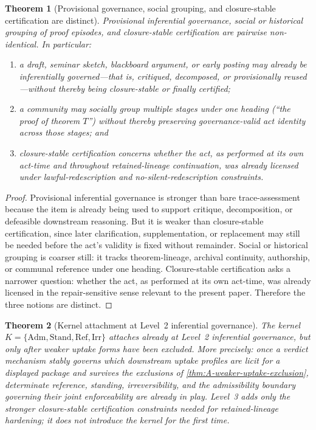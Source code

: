 \documentclass[11pt]{article}
\theoremstyle{plain}
\newtheorem{theorem}{Theorem}[section]
\theoremstyle{definition}
\newcommand{\Adm}{\mathrm{Adm}}
\newcommand{\Stand}{\mathrm{Stand}}
\begin{document}
\begin{theorem}[Provisional governance, social grouping, and closure-stable certification are distinct]
\label{thm:A-provisional-social-governance}
Provisional inferential governance, social or historical grouping of proof episodes, and closure-stable certification are pairwise non-identical. In particular:
\begin{enumerate}[label=(\roman*), leftmargin=2.5em]
    \item a draft, seminar sketch, blackboard argument, or early posting may already be inferentially governed---that is, critiqued, decomposed, or provisionally reused---without thereby being closure-stable or finally certified;
    \item a community may socially group multiple stages under one heading (``the proof of theorem $T$'') without thereby preserving governance-valid act identity across those stages; and
    \item closure-stable certification concerns whether the act, as performed at its own act-time and throughout retained-lineage continuation, was already licensed under lawful-redescription and no-silent-redescription constraints.
\end{enumerate}
\end{theorem}

\begin{proof}
Provisional inferential governance is stronger than bare trace-assessment because the item is already being used to support critique, decomposition, or defeasible downstream reasoning. But it is weaker than closure-stable certification, since later clarification, supplementation, or replacement may still be needed before the act's validity is fixed without remainder. Social or historical grouping is coarser still: it tracks theorem-lineage, archival continuity, authorship, or communal reference under one heading. Closure-stable certification asks a narrower question: whether the act, as performed at its own act-time, was already licensed in the repair-sensitive sense relevant to the present paper. Therefore the three notions are distinct.
\end{proof}

\begin{theorem}[Kernel attachment at Level~2 inferential governance]
\label{thm:A-kernel-attachment}
The kernel $K=\{\Adm,\Stand,\mathrm{Ref},\mathrm{Irr}\}$ attaches already at Level~2 inferential governance, but only after weaker uptake forms have been excluded. More precisely: once a verdict mechanism stably governs which downstream uptake profiles are licit for a displayed package and survives the exclusions of \cref{thm:A-weaker-uptake-exclusion}, determinate reference, standing, irreversibility, and the admissibility boundary governing their joint enforceability are already in play. Level~3 adds only the stronger closure-stable certification constraints needed for retained-lineage hardening; it does not introduce the kernel for the first time.
\end{theorem}
\end{document}
